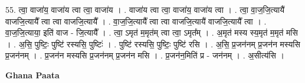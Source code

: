 \documentclass[17pt]{extarticle}
\begin{document}
55. त्वा॒ वाजा॑य॒ वाजा॑य त्वा त्वा॒ वाजा॑य । . वाजा॑य त्वा त्वा॒ वाजा॑य॒ वाजा॑य त्वा । . त्वा॒ वा॒ज॒जि॒त्यायै॑ वाजजि॒त्यायै᳚ त्वा त्वा वाजजि॒त्यायै᳚ । . वा॒ज॒जि॒त्यायै᳚ त्वा त्वा वाजजि॒त्यायै॑ वाजजि॒त्यायै᳚ त्वा । . वा॒ज॒जि॒त्याया॒ इति॑ वाज - जि॒त्यायै᳚ । . त्वा॒ ऽमृत॑ म॒मृत॑म् त्वा त्वा॒ ऽमृत᳚म् । . अ॒मृत॑ मस्य स्य॒मृत॑ म॒मृत॑ मसि । . अ॒सि॒ पुष्टिः॒ पुष्टि॑ रस्यसि॒ पुष्टिः॑ । . पुष्टि॑ रस्यसि॒ पुष्टिः॒ पुष्टि॑ रसि । . अ॒सि॒ प्र॒जन॑नम् प्र॒जन॑न मस्यसि प्र॒जन॑नम् । . प्र॒जन॑न मस्यसि प्र॒जन॑नम् प्र॒जन॑न मसि । . प्र॒जन॑न॒मिति॑ प्र - जन॑नम् । . अ॒सीत्य॑सि । \newline

\textbf{Ghana Paata } \newline
\end{document}

